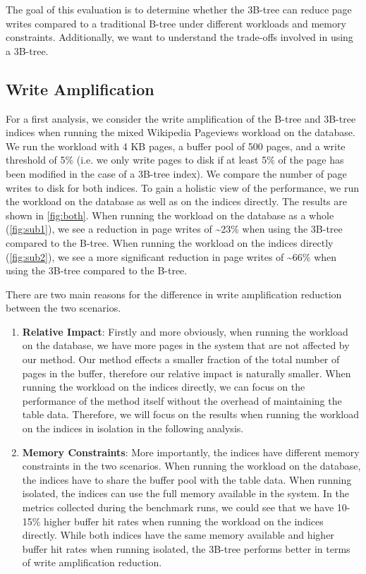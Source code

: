 The goal of this evaluation is to determine whether the 3B-tree can reduce page writes compared to a traditional B-tree under different workloads and memory constraints.
Additionally, we want to understand the trade-offs involved in using a 3B-tree.

\subsection{Write Amplification}
For a first analysis, we consider the write amplification of the B-tree and 3B-tree indices when running the mixed Wikipedia Pageviews workload on the database.
We run the workload with 4 KB pages, a buffer pool of 500 pages, and a write threshold of 5\% (i.e. we only write pages to disk if at least 5\% of the page has been modified in the case of a 3B-tree index).
We compare the number of page writes to disk for both indices.
To gain a holistic view of the performance, we run the workload on the database as well as on the indices directly.
The results are shown in \autoref{fig:both}.
When running the workload on the database as a whole (\autoref{fig:sub1}), we see a reduction in page writes of \textasciitilde23\% when using the 3B-tree compared to the B-tree.
When running the workload on the indices directly (\autoref{fig:sub2}), we see a more significant reduction in page writes of \textasciitilde66\% when using the 3B-tree compared to the B-tree.

There are two main reasons for the difference in write amplification reduction between the two scenarios.
\begin{enumerate}
  \item \textbf{Relative Impact}: Firstly and more obviously, when running the workload on the database, we have more pages in the system that are not affected by our method.
Our method effects a smaller fraction of the total number of pages in the buffer, therefore our relative impact is naturally smaller.
When running the workload on the indices directly, we can focus on the performance of the method itself without the overhead of maintaining the table data.
Therefore, we will focus on the results when running the workload on the indices in isolation in the following analysis.
  \item \textbf{Memory Constraints}: More importantly, the indices have different memory constraints in the two scenarios.
When running the workload on the database, the indices have to share the buffer pool with the table data.
When running isolated, the indices can use the full memory available in the system. 
In the metrics collected during the benchmark runs, we could see that we have 10-15\% higher buffer hit rates when running the workload on the indices directly.
While both indices have the same memory available and higher buffer hit rates when running isolated, the 3B-tree performs better in terms of write amplification reduction.
\end{enumerate}

